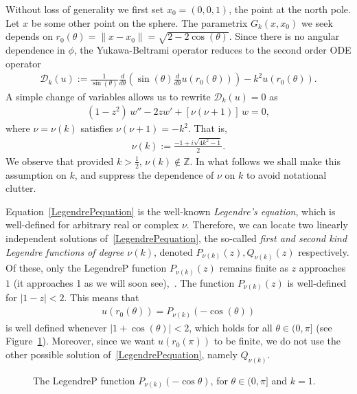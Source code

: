 \documentclass[final]{siamltex}
\begin{document}
Without loss of generality we first set $x_{0}=(0,0,1)$, the point at
the north pole.  Let $x$ be some other point on the sphere. The parametrix $G_k(x,x_0)$ we seek depends on
$r_0(\theta)=\|x-x_0\|=\sqrt{2-2\cos(\theta)} $. Since there is no
angular dependence in $\phi$, the Yukawa-Beltrami operator reduces to
the second order ODE operator
\begin{align*}
\mathcal{D}_k(u):=\frac{1}{\sin(\theta)}\frac{d}{d\theta}\left(\sin(\theta)
\frac{d}{d\theta}u(r_0(\theta))\right)-k^2 u(r_{0}(\theta)).
\end{align*}
A simple change of variables allows us to rewrite $\mathcal{D}_k (u)=0$
as 
\begin{align}
  \label{LegendrePequation}
  (1-z^2)\,w'' -2zw' + \left[\nu(\nu+1)\right]\,w = 0,
\end{align}
where $\nu = \nu(k)$ satisfies $\nu(\nu + 1) = -k^2$. That is,
\begin{align*}  
  \nu(k):=\frac{-1+i\sqrt{4k^2-1}}{2}.
\end{align*}
We observe that provided $k>\frac{1}{2}$, $\nu(k) \notin \mathbb{Z}$. In
what follows we shall make this assumption on $k$, and suppress the
dependence of $\nu$ on $k$ to avoid notational clutter.

Equation~\eqref{LegendrePequation} is the well-known {\it Legendre's
equation}, which is well-defined for arbitrary real or complex $\nu$.
Therefore, we can locate two linearly independent solutions
of~\eqref{LegendrePequation}, the so-called {\it first and second kind
Legendre functions of degree $\nu(k)$}, denoted $ P_{\nu(k)}(z),
Q_{\nu(k)}(z)$ respectively. Of these, only the  LegendreP function
$P_{\nu(k)}(z)$ remains finite as $z$ approaches $1$ (it approaches 1
as we will soon see),~\cite{lebedev}.  The function $P_{\nu(k)}(z)$ is
well-defined for $|1-z|<2$.  This means that
\begin{align*}
  u(r_0(\theta)) =  P_{\nu(k)}(-\cos(\theta))
\end{align*}
is well defined whenever $|1+\cos(\theta)|<2$, which holds for all
$\theta \in(0,\pi]$ (see Figure~\ref{f:legendreP}).  Moreover, since we
want $u(r_0(\pi))$ to be finite, we do not use the other possible
solution of~\eqref{LegendrePequation}, namely $Q_{\nu(k)}$.
\begin{figure}[htps]
  \centering
  
  \caption{\label{f:legendreP} The LegendreP function
  $P_{\nu(k)}(-\cos\theta)$, for $\theta \in (0,\pi]$ and $k=1$.}
\end{figure}  
\end{document}
